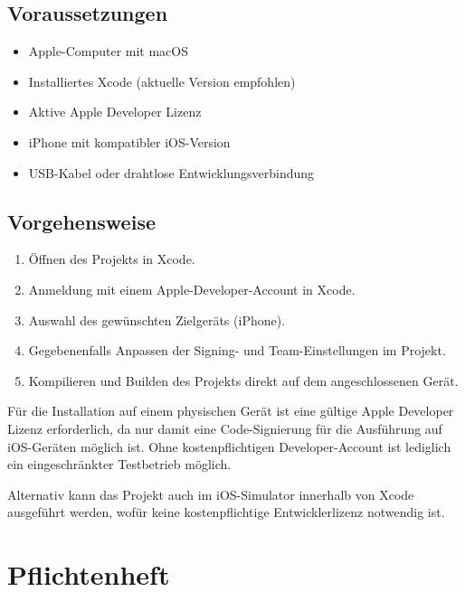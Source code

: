 \subsection*{Voraussetzungen}
 
\begin{itemize}
    \item Apple-Computer mit macOS
    \item Installiertes Xcode (aktuelle Version empfohlen)
    \item Aktive Apple Developer Lizenz
    \item iPhone mit kompatibler iOS-Version
    \item USB-Kabel oder drahtlose Entwicklungsverbindung
\end{itemize}
 
\subsection*{Vorgehensweise}
 
\begin{enumerate}
    \item Öffnen des Projekts in Xcode.
    \item Anmeldung mit einem Apple-Developer-Account in Xcode.
    \item Auswahl des gewünschten Zielgeräts (iPhone).
    \item Gegebenenfalls Anpassen der Signing- und Team-Einstellungen im Projekt.
    \item Kompilieren und Builden des Projekts direkt auf dem angeschlossenen Gerät.
\end{enumerate}
 
Für die Installation auf einem physischen Gerät ist eine gültige Apple Developer Lizenz erforderlich, da nur damit eine Code-Signierung für die Ausführung auf iOS-Geräten möglich ist. Ohne kostenpflichtigen Developer-Account ist lediglich ein eingeschränkter Testbetrieb möglich.
 
Alternativ kann das Projekt auch im iOS-Simulator innerhalb von Xcode ausgeführt werden, wofür keine kostenpflichtige Entwicklerlizenz notwendig ist.


\section{Pflichtenheft}





